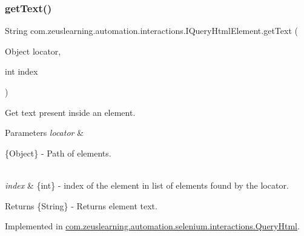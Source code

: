 \hypertarget{interfacecom_1_1zeuslearning_1_1automation_1_1interactions_1_1IQueryHtmlElement_aebeb5bdb3632e1bfc57aeee282074d14}{}\label{interfacecom_1_1zeuslearning_1_1automation_1_1interactions_1_1IQueryHtmlElement_aebeb5bdb3632e1bfc57aeee282074d14} 
\subsubsection{\texorpdfstring{get\+Text()}{getText()}\hspace{0.1cm}{\footnotesize\ttfamily [2/2]}}
{\footnotesize\ttfamily String com.\+zeuslearning.\+automation.\+interactions.\+I\+Query\+Html\+Element.\+get\+Text (\begin{DoxyParamCaption}\item[{Object}]{locator,  }\item[{int}]{index }\end{DoxyParamCaption})}

Get text present inside an element.


\begin{DoxyParams}{Parameters}
{\em locator} & 
\begin{DoxyItemize}
\item \{Object\} -\/ Path of elements. 
\end{DoxyItemize}\\
\hline
{\em index} & \{int\} -\/ index of the element in list of elements found by the locator.\\
\hline
\end{DoxyParams}
\begin{DoxyReturn}{Returns}
\{String\} -\/ Returns element text. 
\end{DoxyReturn}


Implemented in \hyperlink{classcom_1_1zeuslearning_1_1automation_1_1selenium_1_1interactions_1_1QueryHtml_a3f03bea9d1ab38fb888d2f2c629f297e}{com.\+zeuslearning.\+automation.\+selenium.\+interactions.\+Query\+Html}.

\hypertarget{interfacecom_1_1zeuslearning_1_1automation_1_1interactions_1_1IQueryHtmlElement_a0d97c8b92f42a892ba27faef88421fb0}{}\label{interfacecom_1_1zeuslearning_1_1automation_1_1interactions_1_1IQueryHtmlElement_a0d97c8b92f42a892ba27faef88421fb0} 
